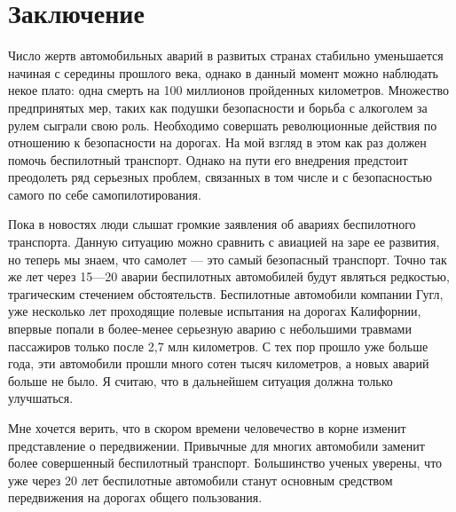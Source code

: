 \chapter*{Заключение}						%

Число жертв автомобильных аварий в развитых странах стабильно уменьшается 
начиная с середины прошлого века, однако в данный момент можно наблюдать
некое плато: одна смерть на 100 
миллионов пройденных километров. Множество предпринятых мер, таких как подушки
безопасности и борьба с алкоголем за рулем сыграли свою роль. Необходимо 
совершать революционные действия по отношению к безопасности на дорогах.
На мой взгляд в этом как раз должен помочь беспилотный транспорт. Однако на пути его 
внедрения предстоит преодолеть ряд серьезных проблем, связанных в том числе и
с безопасностью самого по себе самопилотирования.

Пока в новостях люди слышат громкие заявления об авариях беспилотного транспорта.
Данную ситуацию можно сравнить с авиацией на заре 
ее развития, но теперь мы знаем, что самолет — это самый безопасный транспорт. 
Точно так же лет через 15—20 аварии беспилотных автомобилей будут являться
редкостью, трагическим стечением обстоятельств.
Беспилотные автомобили компании Гугл, уже 
несколько лет проходящие полевые испытания на дорогах Калифорнии, впервые попали 
в более-менее серьезную аварию с небольшими травмами пассажиров только после 2,7 
млн километров. С тех пор прошло уже больше года, эти автомобили прошли 
много сотен тысяч километров, а новых аварий больше не было. Я считаю, что в дальнейшем
ситуация должна только улучшаться.

Мне хочется верить, что в скором времени человечество в корне изменит представление о передвижении.
Привычные для многих автомобили заменит более совершенный беспилотный транспорт. 
Большинство ученых уверены, что уже через 20 лет беспилотные автомобили
станут основным средством передвижения на дорогах общего пользования.
